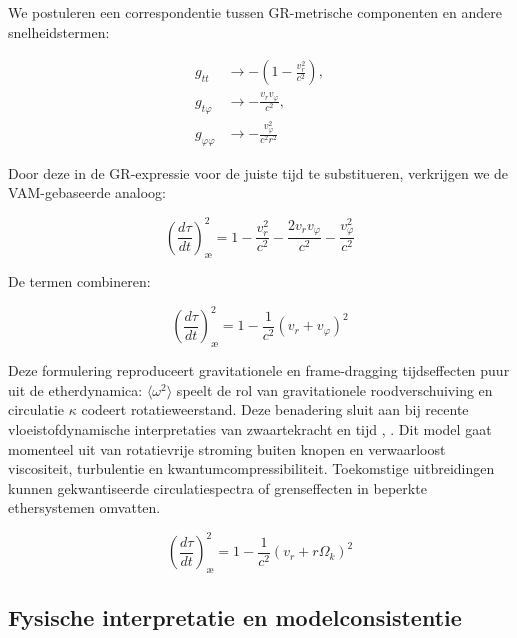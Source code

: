 We postuleren een correspondentie tussen GR-metrische componenten en andere snelheidstermen:

\begin{equation}
\begin{aligned}
g_{tt} &\rightarrow -\left(1 - \frac{v_r^2}{c^2}\right), \\
g_{t\varphi} &\rightarrow -\frac{v_r v_\varphi}{c^2}, \\
g_{\varphi\varphi} &\rightarrow -\frac{v_\varphi^2}{c^2 r^2}
\end{aligned}
\label{eq:VAM_metric_terms}
\end{equation}

Door deze in de GR-expressie voor de juiste tijd te substitueren, verkrijgen we de VAM-gebaseerde analoog:

\begin{equation}
\left( \frac{d\tau}{dt} \right)^2_{\text{\ae}} = 1 - \frac{v_r^2}{c^2} - \frac{2v_r v_\varphi}{c^2} - \frac{v_\varphi^2}{c^2}
\label{eq:VAM_proper_time}
\end{equation}

De termen combineren:

\begin{equation}
\left( \frac{d\tau}{dt} \right)^2_{\text{\ae}} = 1 - \frac{1}{c^2}(v_r + v_\varphi)^2
\label{eq:VAM_proper_time_combined}
\end{equation}

Deze formulering reproduceert gravitationele en frame-dragging tijdseffecten puur uit de etherdynamica: $\langle \omega^2 \rangle$ speelt de rol van gravitationele roodverschuiving en circulatie $\kappa$ codeert rotatieweerstand. Deze benadering sluit aan bij recente vloeistofdynamische interpretaties van zwaartekracht en tijd \cite{barcelo2011analogue}, \cite{fedi2017gravity}.
Dit model gaat momenteel uit van rotatievrije stroming buiten knopen en verwaarloost viscositeit, turbulentie en kwantumcompressibiliteit. Toekomstige uitbreidingen kunnen gekwantiseerde circulatiespectra of grenseffecten in beperkte ethersystemen omvatten.

\begin{equation}
\boxed{\left( \frac{d\tau}{dt} \right)^2_{\text{\ae}} = 1 - \frac{1}{c^2}(v_r + r\Omega_k)^2}
\label{eq:VAM_proper_time_final}
\end{equation}

\subsection{Fysische interpretatie en modelconsistentie}

